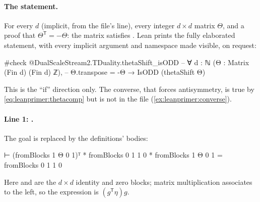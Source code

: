 \paragraph{The statement.} For every $d$ (implicit, from the file's 
line), every integer $d\times d$ matrix $\Theta$, and a proof  that
$\Theta^{\mathsf T}=-\Theta$: the matrix  satisfies . Lean
prints the fully elaborated statement, with every implicit argument and namespace made
visible, on request:
\begin{leancode}
#check @DualScaleStream2.TDuality.thetaShift_isODD
-- ∀ {d : ℕ} (Θ : Matrix (Fin d) (Fin d) ℤ),
--   Θ.transpose = -Θ → IsODD (thetaShift Θ)
\end{leancode}
This is the ``if'' direction only. The converse, that  forces
antisymmetry, is true by \eqref{eq:leanprimer:thetacomp} but is not in the file
(\cref{ex:leanprimer:converse}).

\paragraph{Line 1: .} The goal
 is replaced by the definitions' bodies:
\begin{leancode}
⊢ (fromBlocks 1 Θ 0 1)ᵀ * fromBlocks 0 1 1 0 * fromBlocks 1 Θ 0 1
    = fromBlocks 0 1 1 0
\end{leancode}
Here  and  are the $d\times d$ identity and zero blocks; matrix
multiplication associates to the left, so the expression is $(g^{\mathsf T}\eta)g$.

